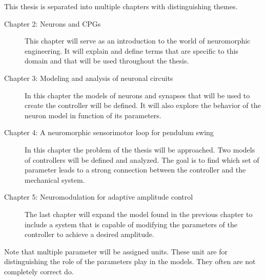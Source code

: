 This thesis is separated into multiple chapters with distinguishing themes.
\begin{description}
 \item[Chapter 2: Neurons and CPGs] This chapter will serve as an introduction to the world of neuromorphic engineering. It will explain and define terms that are specific to this domain and that will be used throughout the thesis.
 \item[Chapter 3: Modeling and analysis of neuronal circuits] In this chapter the models of neurons and synapses that will be used to create the controller will be defined. It will also explore the behavior of the neuron model in function of its parameters. 
 \item[Chapter 4: A neuromorphic sensorimotor loop for pendulum swing] In this chapter the problem of the thesis will be approached. Two models of controllers will be defined and analyzed. The goal is to find which set of parameter leads to a strong connection between the controller and the mechanical system.
 \item[Chapter 5: Neuromodulation for adaptive amplitude control] The last chapter will expand the model found in the previous chapter to include a system that is capable of modifying the parameters of the controller to achieve a desired amplitude. 
\end{description}

Note that multiple parameter will be assigned units. 
These unit are for distinguishing the role of the parameters play in the models.
They often are not completely correct do. 


\iffalse
To reuse an somewhat old but striking example, in 2016 AlphaGO bested one of the best human go player. Yet, AlphaGO consumed around \qty{1}{\mega\watt} to accomplish this feat while the brain of Lee Sedol, the human player, only consumed around \qty{20}{\watt}. And, in addition to playing the game, Lee's brain also processed all its sensory inputs, controlled its arm to make the moves on the board and continued regulating the equilibrium of its body. Better yet, after the game, he was able to go home and perform activities that are fundamentally different from playing go.

This energy gap between machine and human is explained by the fundamental difference in their computational architecture. The traditional architecture uses synchronized computing steps with memory separated from the computing. Conversely, in a neuronal net, the computing is done completely asynchronously and the memory of the systems is integrated in the computing since it is represented by the dynamical nature of the neurons.
\fi
